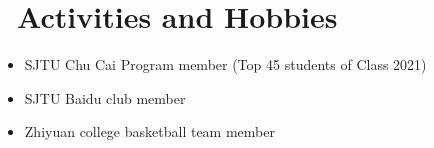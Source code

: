 \documentclass{resume}
\begin{document}
\section{\faHeart\ Activities and Hobbies}
\begin{itemize}[parsep=0.5ex]
  \item SJTU Chu Cai Program member (Top 45 students of Class 2021)
  \item SJTU Baidu club member
  \item Zhiyuan college basketball team member
\end{itemize}

%
%
\end{document}
